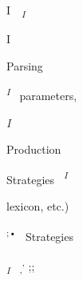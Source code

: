 \begin{center}
\begin{minipage}{0.7425in}
\begin{styleFramecontents}
I\ \ \textit{\textsubscript{I}}
\end{styleFramecontents}


\end{minipage}
\end{center}
\begin{center}
\begin{minipage}{0.078in}
\begin{styleFramecontents}
I
\end{styleFramecontents}


\end{minipage}
\end{center}
\begin{multicols}{3}
\begin{styleStandard}
Parsing
\end{styleStandard}


\begin{styleStandard}
\textit{\textsuperscript{I\ \ }}parameters,
\end{styleStandard}


\begin{styleStandard}
\textit{I}
\end{styleStandard}


\begin{styleStandard}
Production
\end{styleStandard}


\end{multicols}
\begin{multicols}{3}
\begin{styleStandard}
Strategies\textit{\textsuperscript{\ \ }}\textit{\textsuperscript{I}}
\end{styleStandard}


\begin{styleStandard}
lexicon, etc.)
\end{styleStandard}


\begin{styleStandard}
\textsuperscript{;}\textsuperscript{•\ \ }Strategies
\end{styleStandard}


\end{multicols}
\begin{styleStandard}
\textit{\textsubscript{I\ \ }}\textsubscript{,}\textsuperscript{,}\textsuperscript{ };;
\end{styleStandard}



